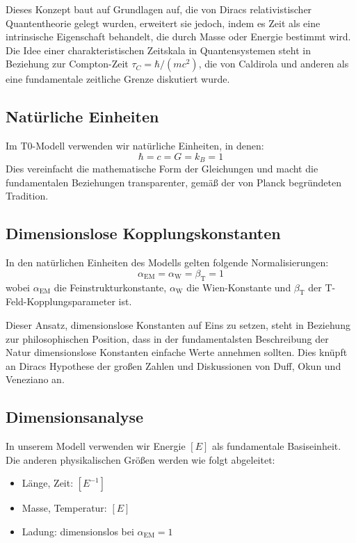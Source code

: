 \documentclass[a4paper,12pt]{article}
\newcommand{\betaT}{\beta_{\text{T}}}
\newcommand{\alphaEM}{\alpha_{\text{EM}}}
\newcommand{\alphaW}{\alpha_{\text{W}}}
\begin{document}
	Dieses Konzept baut auf Grundlagen auf, die von Diracs relativistischer Quantentheorie \cite{Dirac1928} gelegt wurden, erweitert sie jedoch, indem es Zeit als eine intrinsische Eigenschaft behandelt, die durch Masse oder Energie bestimmt wird. Die Idee einer charakteristischen Zeitskala in Quantensystemen steht in Beziehung zur Compton-Zeit $\tau_C = \hbar/(mc^2)$, die von Caldirola \cite{Caldirola1976} und anderen als eine fundamentale zeitliche Grenze diskutiert wurde.
	
	\subsection{Natürliche Einheiten}
	Im T0-Modell verwenden wir natürliche Einheiten, in denen:
	\[
	\hbar = c = G = k_B = 1
	\]
	Dies vereinfacht die mathematische Form der Gleichungen und macht die fundamentalen Beziehungen transparenter, gemäß der von Planck \cite{Planck1899} begründeten Tradition.
	
	\subsection{Dimensionslose Kopplungskonstanten}
	In den natürlichen Einheiten des Modells gelten folgende Normalisierungen:
	\[
	\alphaEM = \alphaW = \betaT = 1
	\]
	wobei $\alphaEM$ die Feinstrukturkonstante, $\alphaW$ die Wien-Konstante und $\betaT$ der T-Feld-Kopplungsparameter ist.
	
	Dieser Ansatz, dimensionslose Konstanten auf Eins zu setzen, steht in Beziehung zur philosophischen Position, dass in der fundamentalsten Beschreibung der Natur dimensionslose Konstanten einfache Werte annehmen sollten. Dies knüpft an Diracs Hypothese der großen Zahlen \cite{Dirac1937} und Diskussionen von Duff, Okun und Veneziano \cite{Duff2002} an.
	
	\subsection{Dimensionsanalyse}
	In unserem Modell verwenden wir Energie $[E]$ als fundamentale Basiseinheit. Die anderen physikalischen Größen werden wie folgt abgeleitet:
	\begin{itemize}
		\item Länge, Zeit: $[E^{-1}]$
		\item Masse, Temperatur: $[E]$
		\item Ladung: dimensionslos bei $\alphaEM = 1$
	\end{itemize}
	
\end{document}
